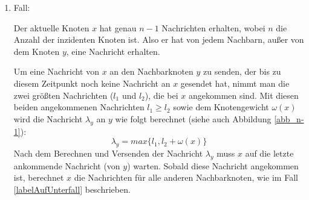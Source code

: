 \begin{enumerate}
		
	
			
	\item Fall:\label{algo_fall_2}
	
		
		Der aktuelle Knoten $x$ hat genau $n-1$ Nachrichten erhalten, wobei $n$ die Anzahl der inzidenten Knoten ist. Also er hat von jedem Nachbarn, außer von dem Knoten $y$, eine Nachricht erhalten.
		
	
		
		Um eine Nachricht von $x$ an den Nachbarknoten $y$ zu senden, der bis zu diesem Zeitpunkt noch keine Nachricht an $x$ gesendet hat, nimmt man die zwei größten Nachrichten ($l_{1}$ und $l_{2}$), die bei $x$ angekommen sind. Mit diesen beiden angekommenen Nachrichten $l_{1} \ge l_{2}$ sowie dem Knotengewicht $\omega(x)$ wird die Nachricht $\lambda_{y}$ an $y$ wie folgt berechnet (siehe auch Abbildung \ref{abb_n-1}): $$\lambda_{y} = max\{l_{1},  l_{2} + \omega(x)\}$$
		Nach dem Berechnen und Versenden der Nachricht $\lambda_{y}$ muss $x$ auf die letzte ankommende Nachricht (von $y$) warten. Sobald diese Nachricht angekommen ist, berechnet $x$ die Nachrichten für alle anderen Nachbarknoten, wie im Fall \ref{labelAufUnterfall} beschrieben. 
		
		
		
		

\end{enumerate}
